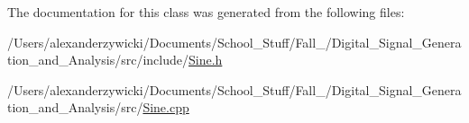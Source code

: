 The documentation for this class was generated from the following files\+:\begin{DoxyCompactItemize}
\item 
/\+Users/alexanderzywicki/\+Documents/\+School\+\_\+\+Stuff/\+Fall\+\_/\+Digital\+\_\+\+Signal\+\_\+\+Generation\+\_\+and\+\_\+\+Analysis/src/include/\hyperlink{_sine_8h}{Sine.\+h}\item 
/\+Users/alexanderzywicki/\+Documents/\+School\+\_\+\+Stuff/\+Fall\+\_/\+Digital\+\_\+\+Signal\+\_\+\+Generation\+\_\+and\+\_\+\+Analysis/src/\hyperlink{_sine_8cpp}{Sine.\+cpp}\end{DoxyCompactItemize}
